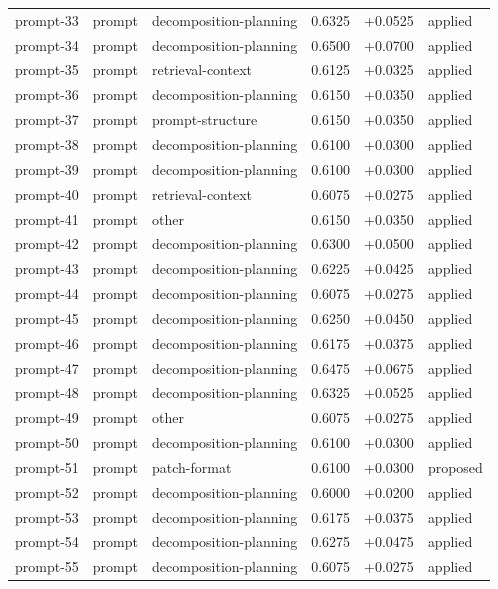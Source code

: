 \begin{center}
\begin{longtable}{llp{5.2cm}rrl}
prompt-33 & prompt & decomposition-planning & 0.6325 & +0.0525 & applied \\
prompt-34 & prompt & decomposition-planning & 0.6500 & +0.0700 & applied \\
prompt-35 & prompt & retrieval-context & 0.6125 & +0.0325 & applied \\
prompt-36 & prompt & decomposition-planning & 0.6150 & +0.0350 & applied \\
prompt-37 & prompt & prompt-structure & 0.6150 & +0.0350 & applied \\
prompt-38 & prompt & decomposition-planning & 0.6100 & +0.0300 & applied \\
prompt-39 & prompt & decomposition-planning & 0.6100 & +0.0300 & applied \\
prompt-40 & prompt & retrieval-context & 0.6075 & +0.0275 & applied \\
prompt-41 & prompt & other & 0.6150 & +0.0350 & applied \\
prompt-42 & prompt & decomposition-planning & 0.6300 & +0.0500 & applied \\
prompt-43 & prompt & decomposition-planning & 0.6225 & +0.0425 & applied \\
prompt-44 & prompt & decomposition-planning & 0.6075 & +0.0275 & applied \\
prompt-45 & prompt & decomposition-planning & 0.6250 & +0.0450 & applied \\
prompt-46 & prompt & decomposition-planning & 0.6175 & +0.0375 & applied \\
prompt-47 & prompt & decomposition-planning & 0.6475 & +0.0675 & applied \\
prompt-48 & prompt & decomposition-planning & 0.6325 & +0.0525 & applied \\
prompt-49 & prompt & other & 0.6075 & +0.0275 & applied \\
prompt-50 & prompt & decomposition-planning & 0.6100 & +0.0300 & applied \\
prompt-51 & prompt & patch-format & 0.6100 & +0.0300 & proposed \\
prompt-52 & prompt & decomposition-planning & 0.6000 & +0.0200 & applied \\
prompt-53 & prompt & decomposition-planning & 0.6175 & +0.0375 & applied \\
prompt-54 & prompt & decomposition-planning & 0.6275 & +0.0475 & applied \\
prompt-55 & prompt & decomposition-planning & 0.6075 & +0.0275 & applied \\

\end{longtable}
\end{center}
